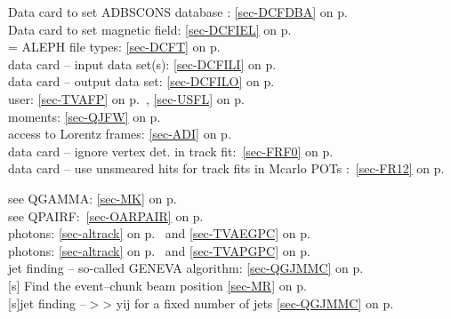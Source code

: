  Data card to set ADBSCONS database :  \ref{sec-DCFDBA} on p.~\pageref{sec-DCFDBA}\\
 Data card to set magnetic field: \ref{sec-DCFIEL} on p.~\pageref{sec-DCFIEL}\\
 = ALEPH file types: \ref{sec-DCFT} on p.~\pageref{sec-DCFT}\\
 data card -- input data set(s): \ref{sec-DCFILI} on p.~\pageref{sec-DCFILI}\\
 data card -- output data set: \ref{sec-DCFILO} on p.~\pageref{sec-DCFILO}\\
 user: \ref{sec-TVAFP} on p.~\pageref{sec-TVAFP},
 \ref{sec-USFL} on p.~\pageref{sec-USFL}\\
 moments: \ref{sec-QJFW} on p.~\pageref{sec-QJFW}\\
 access to Lorentz frames: \ref{sec-ADI} on p.~\pageref{sec-ADI}\\
 data card -- ignore vertex det. in track
 fit:~\ref{sec-FRF0} on p.~\pageref{sec-FRF0}\\
 data card -- use unsmeared hits for track fits in Mcarlo POTs
 :~\ref{sec-FR12} on p.~\pageref{sec-FR12}
 
 see QGAMMA: \ref{sec-MK} on p.~\pageref{sec-MK}\\
 see QPAIRF:~\ref{sec-OARPAIR} on
 p.~\pageref{sec-OARPAIR}\\
 photons: \ref{sec-altrack}
 on p.~\pageref{sec-altrack} and
 \ref{sec-TVAEGPC} on p.~\pageref{sec-TVAEGPC}\\
 photons: \ref{sec-altrack}
 on p.~\pageref{sec-altrack} and
 \ref{sec-TVAPGPC} on p.~\pageref{sec-TVAPGPC}\\
 jet finding -- so-called GENEVA algorithm:           
 \ref{sec-QGJMMC} on p.~\pageref{sec-QGJMMC}\\
 [s] Find the event--chunk beam position
 \ref{sec-MR} on p.~\pageref{sec-MR}\\
  [s]jet finding --$>$> yij for a fixed number of jets
 \ref{sec-QGJMMC} on p.~\pageref{sec-QGJMMC}\\

